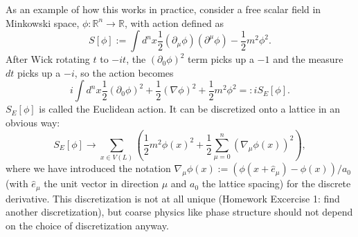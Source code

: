 \documentclass[9pt,twocolumn,twoside]{article}
\begin{document}
As an example of how this works in practice, consider a free scalar field in Minkowski space, $\phi:\mathbb{R}^n\rightarrow \mathbb{R}$, with action defined as 
\[S[\phi] := \int d^nx \frac{1}{2}(\partial_{\mu}\phi) (\partial^{\mu}\phi) - \frac{1}{2}m^2\phi^2.\]
After Wick rotating $t$ to $-it$, the $(\partial_0\phi)^2$ term picks up a $-1$ and the measure $dt$ picks up a $-i$, so the action becomes
\[i \int d^nx \frac{1}{2}(\partial_0\phi)^2 + \frac{1}{2}(\nabla\phi)^2 + \frac{1}{2}m^2\phi^2 =: i S_E[\phi].\]
$S_E[\phi]$ is called the Euclidean action.  It can be discretized onto a lattice in an obvious way:
\[ S_E[\phi] \rightarrow \sum_{x\in V(L)} \left( \frac{1}{2}m^2\phi(x)^2 + \frac{1}{2} \sum_{\mu=0}^n (\nabla_{\mu} \phi(x))^2 \right),\]
where we have introduced the notation $\nabla_{\mu} \phi(x) := (\phi(x+\hat{e}_{\mu}) - \phi(x))/a_0$ (with $\hat{e}_{\mu}$ the unit vector in direction $\mu$ and $a_0$ the lattice spacing) for the discrete derivative.  This discretization is not at all unique (Homework Excercise 1: find another discretization), but coarse physics like phase structure should not depend on the choice of discretization anyway.  
\end{document}
